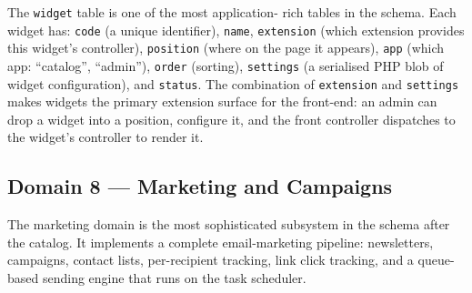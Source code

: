 \documentclass[11pt,a4paper]{article}
\begin{document}
The \texttt{widget} table is one of the most application-
rich tables in the schema. Each widget has:
\texttt{code} (a unique identifier), \texttt{name},
\texttt{extension} (which extension provides this widget's
controller), \texttt{position} (where on the page it
appears), \texttt{app} (which app: ``catalog'',
``admin''), \texttt{order} (sorting), \texttt{settings}
(a serialised PHP blob of widget configuration), and
\texttt{status}. The combination of \texttt{extension}
and \texttt{settings} makes widgets the primary
extension surface for the front-end: an admin can drop a
widget into a position, configure it, and the front
controller dispatches to the widget's controller to
render it.

\subsection{Domain 8 --- Marketing and Campaigns}\label{sec:marketing}

The marketing domain is the most sophisticated subsystem in
the schema after the catalog. It implements a complete
email-marketing pipeline: newsletters, campaigns, contact
lists, per-recipient tracking, link click tracking, and a
queue-based sending engine that runs on the task scheduler.
\end{document}
